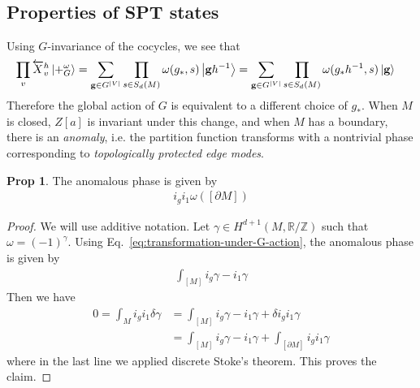 \documentclass{article}
\theoremstyle{definition}
\theoremstyle{definition}
\newtheorem{prop}{Prop}
\newcommand{\Z}{\mathbb Z}
\newcommand{\R}{\mathbb R}
\begin{document}
\subsection{Properties of SPT states}
Using $G$-invariance of the cocycles, we see that
\begin{align}\label{eq:transformation-under-G-action}
\prod_v \overleftarrow X^h_v \ket{+^\omega_G} &= \sum_{\vb g \in G^{|V|}}\prod_{s \in S_d(M)}\omega(g_*, s)\ket{\vb gh^{-1}} =  \sum_{\vb g \in G^{|V|}}\prod_{s \in S_d(M)}\omega(g_*h^{-1}, s)\ket{\vb g}
\end{align}
Therefore the global action of $G$ is equivalent to a different choice of $g_*$.
When $M$ is closed, $Z[a]$ is invariant under this change, and when
$M$ has a boundary, there is an \textit{anomaly}, i.e. the partition function
transforms with a nontrivial phase corresponding to \textit{topologically
protected edge modes}.

\begin{prop}\label{prop:anomaly-formula}
The anomalous phase is given by
\begin{align}
i_gi_1\omega([\partial M])
\end{align}
\end{prop}

\begin{proof}
  We will use additive notation. Let $\gamma \in H^{d+1}(M, \R/\Z)$ such that
  $\omega = (-1)^\gamma$.
  Using Eq.~\eqref{eq:transformation-under-G-action}, the anomalous phase is
  given by
  \begin{align}
    \int_{[M]} i_g\gamma - i_1 \gamma
  \end{align}
  Then we have
  \begin{align}
     0 = \int_{M} i_gi_1\delta \gamma &= 
    \int_{[M]} i_g\gamma - i_1 \gamma + \delta i_gi_1\gamma \\
    &= \int_{[M]} i_g\gamma - i_1 \gamma + \int_{[\partial M]}i_gi_1\gamma
  \end{align}
  where in the last line we applied discrete Stoke's theorem.
  This proves the claim.
\end{proof}
\end{document}
